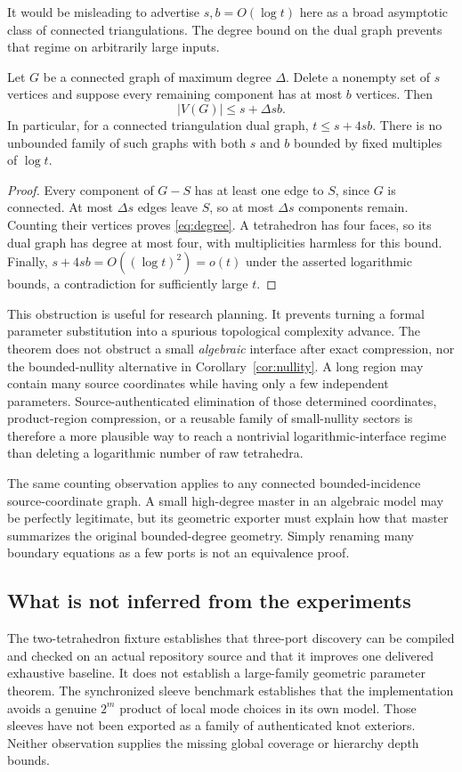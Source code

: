 It would be misleading to advertise $s,b=O(\log t)$ here as a broad asymptotic class of connected triangulations. The degree bound on the dual graph prevents that regime on arbitrarily large inputs.

\begin{proposition}
\label{prop:degree}
Let $G$ be a connected graph of maximum degree $\Delta$. Delete a nonempty set of $s$ vertices and suppose every remaining component has at most $b$ vertices. Then
\begin{equation}
 |V(G)|\le s+\Delta sb.
 \label{eq:degree}
\end{equation}
In particular, for a connected triangulation dual graph, $t\le s+4sb$. There is no unbounded family of such graphs with both $s$ and $b$ bounded by fixed multiples of $\log t$.
\end{proposition}
\begin{proof}
Every component of $G-S$ has at least one edge to $S$, since $G$ is connected. At most $\Delta s$ edges leave $S$, so at most $\Delta s$ components remain. Counting their vertices proves \eqref{eq:degree}. A tetrahedron has four faces, so its dual graph has degree at most four, with multiplicities harmless for this bound. Finally, $s+4sb=O((\log t)^2)=o(t)$ under the asserted logarithmic bounds, a contradiction for sufficiently large $t$.
\end{proof}

This obstruction is useful for research planning. It prevents turning a formal parameter substitution into a spurious topological complexity advance. The theorem does not obstruct a small \emph{algebraic} interface after exact compression, nor the bounded-nullity alternative in Corollary~\ref{cor:nullity}. A long region may contain many source coordinates while having only a few independent parameters. Source-authenticated elimination of those determined coordinates, product-region compression, or a reusable family of small-nullity sectors is therefore a more plausible way to reach a nontrivial logarithmic-interface regime than deleting a logarithmic number of raw tetrahedra.

The same counting observation applies to any connected bounded-incidence source-coordinate graph. A small high-degree master in an algebraic model may be perfectly legitimate, but its geometric exporter must explain how that master summarizes the original bounded-degree geometry. Simply renaming many boundary equations as a few ports is not an equivalence proof.

\subsection{What is not inferred from the experiments}
The two-tetrahedron fixture establishes that three-port discovery can be compiled and checked on an actual repository source and that it improves one delivered exhaustive baseline. It does not establish a large-family geometric parameter theorem. The synchronized sleeve benchmark establishes that the implementation avoids a genuine $2^m$ product of local mode choices in its own model. Those sleeves have not been exported as a family of authenticated knot exteriors. Neither observation supplies the missing global coverage or hierarchy depth bounds.
